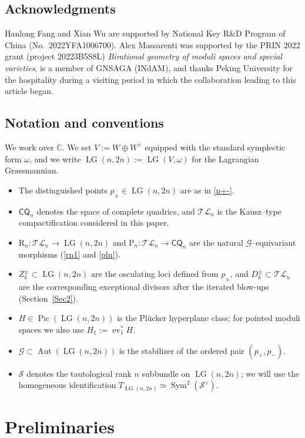 \documentclass[10pt]{amsart}
\theoremstyle{definition}
\newcommand{\C}{\mathbb{C}}
\newcommand{\Pic}{\operatorname{Pic}}
\newcommand{\Aut}{\operatorname{Aut}}
\newcommand{\LG}{\operatorname{LG}}
\newcommand{\CQ}{\mathsf{CQ}}
\DeclareMathOperator{\Sym}{Sym}
\newcommand{\ev}{\operatorname{ev}}
\newcommand{\TL}{\mathcal{TL}}
\newcommand{\RL}{\mathrm{R}}
\newcommand{\PL}{\mathrm{P}}
\theoremstyle{plain} %
\begin{document}
\subsection*{Acknowledgments}
Hanlong Fang and Xian Wu are supported by National Key R\&D Program of China (No.~2022YFA1006700).
Alex Massarenti was supported by the PRIN 2022 grant (project 20223B5S8L) \emph{Birational geometry of moduli spaces and special varieties}, is a member of GNSAGA (INdAM), and thanks Peking University for the hospitality during a visiting period in which the collaboration leading to this article began.


\subsection*{Notation and conventions}
We work over $\C$. We set $V:=W\oplus W^\vee$ equipped with the standard symplectic form $\omega$, and we write
$\LG(n,2n):=\LG(V,\omega)$ for the Lagrangian Grassmannian.
\begin{itemize}[leftmargin=*, itemsep=2pt]
    \item The distinguished points $p_\pm\in\LG(n,2n)$ are as in \eqref{p+-}.
    \item $\CQ_n$ denotes the space of complete quadrics, and $\TL_n$ is the Kausz--type compactification considered in this paper.
    \item $\RL_n\colon \TL_n\to \LG(n,2n)$ and $\PL_n\colon \TL_n\to \CQ_n$ are the natural $\mathscr G$--equivariant morphisms (\eqref{rn1} and \eqref{pln}).
    \item $Z_k^\pm\subset \LG(n,2n)$ are the osculating loci defined from $p_\pm$, and $D_k^\pm\subset \TL_n$ are the corresponding exceptional divisors after the iterated blow-ups (Section~\ref{Sec2}).
    \item $H\in\Pic(\LG(n,2n))$ is the Pl\"ucker hyperplane class; for pointed moduli spaces we also use $H_1:=\ev_1^*H$.
    \item $\mathscr G\subset \Aut(\LG(n,2n))$ is the stabilizer of the ordered pair $(p_+,p_-)$.
    \item $\mathcal S$ denotes the tautological rank $n$ subbundle on $\LG(n,2n)$; we will use the homogeneous identification
    $T_{\LG(n,2n)}\simeq \Sym^2(\mathcal S^\vee)$.
\end{itemize}

\section{Preliminaries}\label{Sec1}
\end{document}
